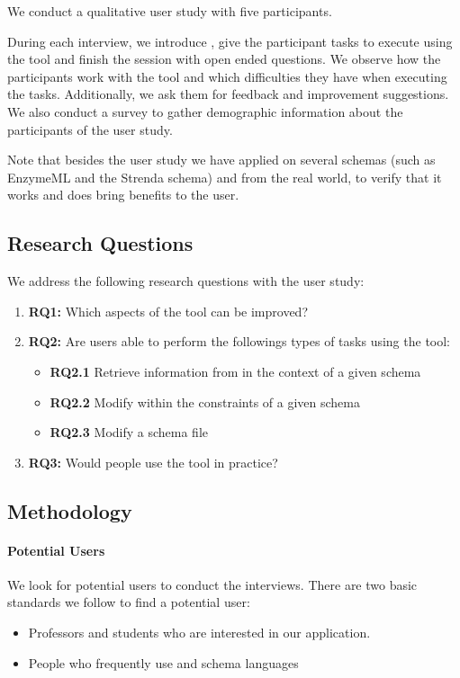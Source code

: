 We conduct a qualitative user study with five participants.

During each interview, we introduce \toolname{}, give the participant tasks to execute using the tool and finish the session with open ended questions.
We observe how the participants work with the tool and which difficulties they have when executing the tasks.
Additionally, we ask them for feedback and improvement suggestions.
We also conduct a survey to gather demographic information about the participants of the user study.

Note that besides the user study we have applied \toolname{} on several schemas (such as EnzymeML\cite{TODO} and the Strenda schema\cite{TODO}) and \cfgfiles{} from the real world, to verify that it works and does bring benefits to the user.

\subsection{Research Questions}\label{subsec:research_questions}
We address the following research questions with the user study:
\begin{enumerate}
	\item \textbf{RQ1:} Which aspects of the tool can be improved?
	\item \textbf{RQ2:} Are users able to perform the followings types of tasks using the tool:
	 \begin{itemize}
			\item \textbf{RQ2.1} Retrieve information from \cfgfiles{} in the context of a given schema
			\item \textbf{RQ2.2} Modify \cfgfiles{} within the constraints of a given schema
			\item \textbf{RQ2.3} Modify a schema file
		\end{itemize}
	\item \textbf{RQ3:} Would people use the tool in practice?
\end{enumerate}

\subsection{Methodology}\label{subsec:methodology} %

\paragraph{Potential Users}
We look for potential users to conduct the interviews.
There are two basic standards we follow to find a potential user:
\begin{itemize}
    \item Professors and students who are interested in our application.
    \item People who frequently use \cfgfiles and schema languages
\end{itemize}

